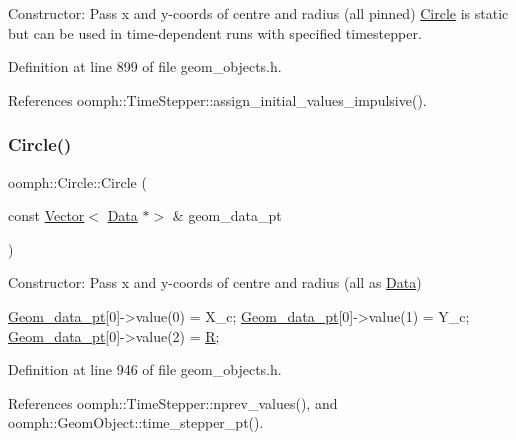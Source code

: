 Constructor\+: Pass x and y-\/coords of centre and radius (all pinned) \hyperlink{classoomph_1_1Circle}{Circle} is static but can be used in time-\/dependent runs with specified timestepper. 



Definition at line 899 of file geom\+\_\+objects.\+h.



References oomph\+::\+Time\+Stepper\+::assign\+\_\+initial\+\_\+values\+\_\+impulsive().

\mbox{\label{classoomph_1_1Circle_a0a173fef925b4df6ca86d65a57de06c7}} 
\subsubsection{\texorpdfstring{Circle()}{Circle()}\hspace{0.1cm}{\footnotesize\ttfamily [3/4]}}
{\footnotesize\ttfamily oomph\+::\+Circle\+::\+Circle (\begin{DoxyParamCaption}\item[{const \hyperlink{classoomph_1_1Vector}{Vector}$<$ \hyperlink{classoomph_1_1Data}{Data} $\ast$$>$ \&}]{geom\+\_\+data\+\_\+pt }\end{DoxyParamCaption})\hspace{0.3cm}{\ttfamily [inline]}}



Constructor\+: Pass x and y-\/coords of centre and radius (all as \hyperlink{classoomph_1_1Data}{Data}) 


\begin{DoxyCode}
\hyperlink{classoomph_1_1Circle_a5684eac02d83744f4966a2c94fb161ba}{Geom\_data\_pt}[0]->value(0) = X\_c;
\hyperlink{classoomph_1_1Circle_a5684eac02d83744f4966a2c94fb161ba}{Geom\_data\_pt}[0]->value(1) = Y\_c;
\hyperlink{classoomph_1_1Circle_a5684eac02d83744f4966a2c94fb161ba}{Geom\_data\_pt}[0]->value(2) = \hyperlink{classoomph_1_1Circle_afdaf92e7bab3349f00eb28c44ccdce08}{R};
\end{DoxyCode}
 

Definition at line 946 of file geom\+\_\+objects.\+h.



References oomph\+::\+Time\+Stepper\+::nprev\+\_\+values(), and oomph\+::\+Geom\+Object\+::time\+\_\+stepper\+\_\+pt().

\mbox{\label{classoomph_1_1Circle_a3fcb41fc1728459d3a669674921082e5}} 
